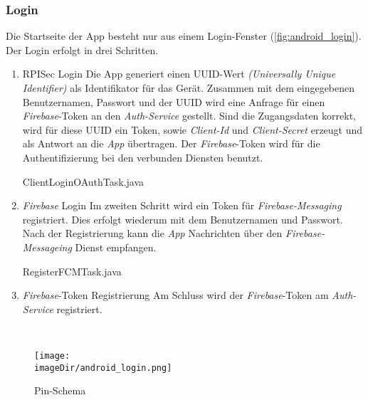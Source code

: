 \subsubsection{Login}
Die Startseite der App besteht nur aus einem Login-Fenster (\autoref{fig:android_login}). Der Login erfolgt in drei Schritten.

\begin{enumerate}
	\item RPISec Login
	\newline
	\newline
	Die App generiert einen UUID-Wert \emph{(Universally Unique Identifier)} als Identifikator für das Gerät. Zusammen mit dem eingegebenen Benutzernamen, Passwort und der UUID wird eine Anfrage für einen \emph{Firebase}-Token an den \emph{Auth-Service} gestellt. Sind die Zugangsdaten korrekt, wird für diese UUID ein Token, sowie \emph{Client-Id} und \emph{Client-Secret} erzeugt und als Antwort an die \emph{App} übertragen. Der \emph{Firebase}-Token wird für die Authentifizierung bei den verbunden Diensten benutzt.
	\newpage
	
	\begin{code}
		\caption{ClientLoginOAuthTask.java}
		\label{src:ClientLoginOAuthTask}
	\end{code}
		
	\item  \emph{Firebase} Login
	\newline
	\newline
	Im zweiten Schritt wird ein Token für \emph{Firebase-Messaging} registriert. Dies erfolgt wiederum mit dem Benutzernamen und Passwort. Nach der Registrierung kann die \emph{App} Nachrichten über den \emph{Firebase-Messageing} Dienst empfangen.\\
	
	\begin{code}
		\caption{RegisterFCMTask.java}
		\javaFile{\srcDir/RegisterFCMTask.java}
		\label{src:RegisterFCMTask}
	\end{code}

	\item \emph{Firebase}-Token Registrierung 
	\newline
	\newline
	Am Schluss wird der \emph{Firebase}-Token am \emph{Auth-Service} registriert.
 \end{enumerate}
\ \newpage

\begin{figure}
	\centering
	\texttt{[image: \\imageDir/android\_login.png]}
	\caption{Pin-Schema}
	\label{fig:android_login}
\end{figure}

